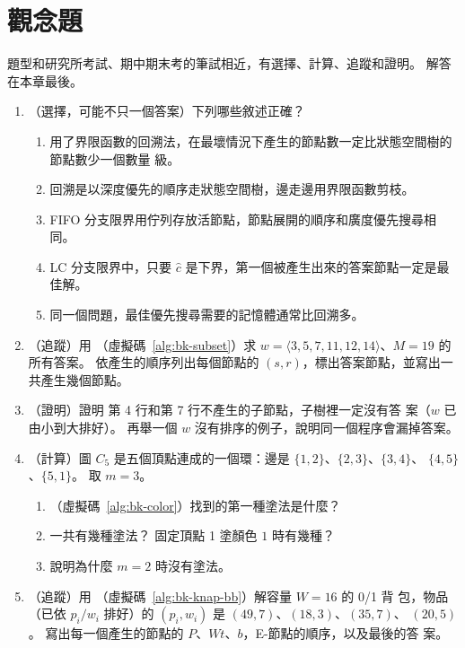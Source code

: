 \section{觀念題}
\label{sec:bk-exercises}

題型和研究所考試、期中期末考的筆試相近，有選擇、計算、追蹤和證明。 解答在本章最後。

\begin{enumerate}
\item （選擇，可能不只一個答案）下列哪些敘述正確？
\begin{enumerate}
\item 用了界限函數的回溯法，在最壞情況下產生的節點數一定比狀態空間樹的節點數少一個數量
級。
\item 回溯是以深度優先的順序走狀態空間樹，邊走邊用界限函數剪枝。
\item FIFO 分支限界用佇列存放活節點，節點展開的順序和廣度優先搜尋相同。
\item LC 分支限界中，只要 $\hat c$ 是下界，第一個被產生出來的答案節點一定是最佳解。
\item 同一個問題，最佳優先搜尋需要的記憶體通常比回溯多。
\end{enumerate}

\item （追蹤）用 （虛擬碼~\ref{alg:bk-subset}）求
$w = \langle 3, 5, 7, 11, 12, 14 \rangle$、$M = 19$ 的所有答案。 依產生的順序列出每個節點的
$(s, r)$，標出答案節點，並寫出一共產生幾個節點。

\item （證明）證明  第 4 行和第 7 行不產生的子節點，子樹裡一定沒有答
案（$w$ 已由小到大排好）。 再舉一個 $w$ 沒有排序的例子，說明同一個程序會漏掉答案。

\item （計算）圖 $C_5$ 是五個頂點連成的一個環：邊是 $\{1,2\}$、$\{2,3\}$、$\{3,4\}$、
$\{4,5\}$、$\{5,1\}$。 取 $m = 3$。
\begin{enumerate}
\item {}（虛擬碼~\ref{alg:bk-color}）找到的第一種塗法是什麼？
\item 一共有幾種塗法？ 固定頂點 1 塗顏色 $1$ 時有幾種？
\item 說明為什麼 $m = 2$ 時沒有塗法。
\end{enumerate}

\item （追蹤）用 （虛擬碼~\ref{alg:bk-knap-bb}）解容量 $W = 16$ 的 0/1 背
包，物品（已依 $p_i / w_i$ 排好）的 $(p_i, w_i)$ 是 $(49, 7)$、$(18, 3)$、$(35, 7)$、
$(20, 5)$。 寫出每一個產生的節點的 $P$、$\mathit{Wt}$、$b$，E-節點的順序，以及最後的答
案。


\end{enumerate}
